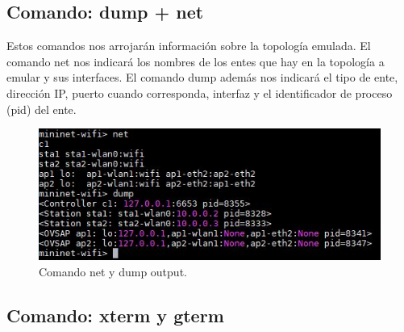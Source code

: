 \subsection{Comando: dump + net}
Estos comandos nos arrojarán información sobre la topología emulada. El comando net nos indicará los nombres de los entes que hay en la topología a emular y sus interfaces. El comando dump además nos indicará el tipo de ente, dirección IP, puerto cuando corresponda, interfaz y el identificador de proceso (pid) del ente.

 \begin{figure}[!htb]
  \centering
    \includegraphics[width=0.8\linewidth]{./img/cli/2.JPG}
    \caption{Comando net y dump output.}
  \label{fig:yo}
\end{figure}
\subsection{Comando: xterm y gterm}


